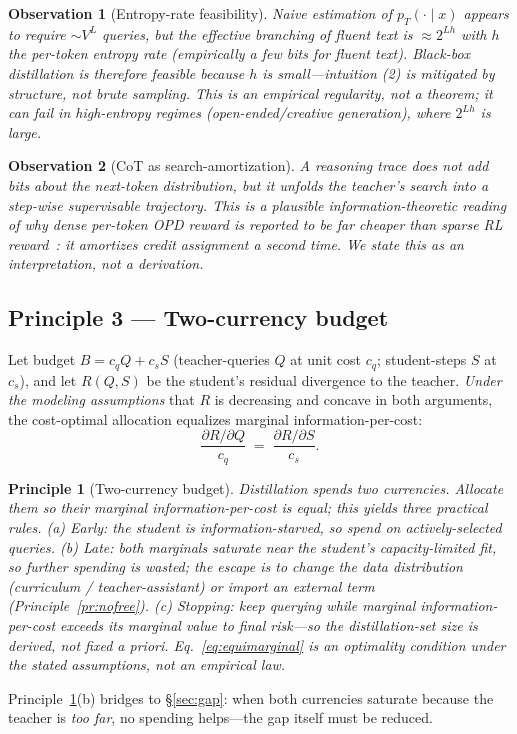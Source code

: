 \documentclass[11pt]{article}
\newtheorem{principle}{Principle}
\newtheorem{observation}{Observation}
\begin{document}
\begin{observation}[Entropy-rate feasibility]\label{obs:entropy}
Naive estimation of $p_T(\cdot\mid x)$ appears to require $\sim V^L$ queries, but the effective branching of fluent text is $\approx 2^{Lh}$ with $h$ the per-token entropy rate (empirically a few bits for fluent text). Black-box distillation is therefore feasible because $h$ is small---intuition (2) is mitigated by \emph{structure}, not brute sampling. This is an empirical regularity, not a theorem; it can fail in high-entropy regimes (open-ended/creative generation), where $2^{Lh}$ is large.
\end{observation}

\begin{observation}[CoT as search-amortization]\label{obs:cot}
A reasoning trace does not add bits about the next-token distribution, but it \emph{unfolds the teacher's search into a step-wise supervisable trajectory}. This is a plausible information-theoretic reading of why dense per-token OPD reward is reported to be far cheaper than sparse RL reward~\cite{lu2025opd}: it amortizes credit assignment a second time. We state this as an interpretation, not a derivation.
\end{observation}

\subsection{Principle 3 --- Two-currency budget}
Let budget $B = c_q Q + c_s S$ (teacher-queries $Q$ at unit cost $c_q$; student-steps $S$ at $c_s$), and let $R(Q,S)$ be the student's residual divergence to the teacher. \emph{Under the modeling assumptions} that $R$ is decreasing and concave in both arguments, the cost-optimal allocation equalizes marginal information-per-cost:
\begin{equation}
\frac{\partial R/\partial Q}{c_q} \;=\; \frac{\partial R/\partial S}{c_s}.
\label{eq:equimarginal}
\end{equation}
\begin{principle}[Two-currency budget]\label{pr:budget}
Distillation spends two currencies. Allocate them so their marginal information-per-cost is equal; this yields three practical rules. (a) \emph{Early}: the student is information-starved, so spend on actively-selected queries. (b) \emph{Late}: both marginals saturate near the student's capacity-limited fit, so further spending is wasted; the escape is to change the data distribution (curriculum / teacher-assistant) or import an external term (Principle~\ref{pr:nofree}). (c) \emph{Stopping}: keep querying while marginal information-per-cost exceeds its marginal value to final risk---so the distillation-set \emph{size is derived, not fixed a priori}. Eq.~\eqref{eq:equimarginal} is an optimality condition under the stated assumptions, not an empirical law.
\end{principle}
Principle~\ref{pr:budget}(b) bridges to \S\ref{sec:gap}: when both currencies saturate because the teacher is \emph{too far}, no spending helps---the gap itself must be reduced.
\end{document}
